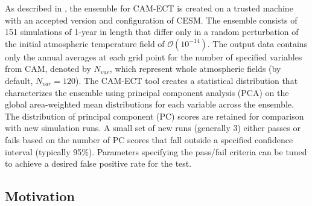 \documentclass[gmd, manuscript]{copernicus}
\begin{document}
As described in \cite{baker2015}, the ensemble for CAM-ECT is created on a trusted machine with an accepted version and configuration of CESM. The ensemble consists of 151 simulations of 1-year in length that differ only in a random perturbation of the initial atmospheric temperature field of $\mathcal{O}(10^{-14})$.  The output data contains only the annual averages at each grid point for the number of specified variables from CAM, denoted by $N_{var}$, which represent whole atmospheric fields (by default, $N_{var}=120$).  The CAM-ECT tool creates a statistical distribution that characterizes the ensemble using principal component analysis (PCA) on the global area-weighted mean distributions for each variable across the ensemble.  The distribution of principal component (PC) scores are retained for comparison with new simulation runs.  A small set of new runs (generally 3) either passes or fails based on the number of PC scores that fall outside a specified confidence interval (typically 95$\%$). Parameters specifying the pass/fail criteria can be tuned to achieve a desired false positive rate for the test.

\subsection{Motivation}
\end{document}
